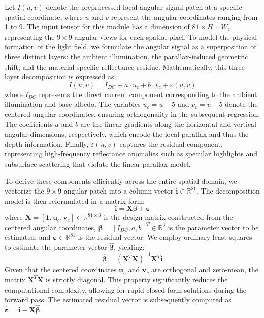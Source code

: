 \documentclass[lettersize,journal]{IEEEtran}
\begin{document}
Let $I(u,v)$ denote the preprocessed local angular signal patch at a specific spatial coordinate, where $u$ and $v$ represent the angular coordinates ranging from 1 to 9. The input tensor for this module has a dimension of $81 \times H \times W$, representing the $9 \times 9$ angular views for each spatial pixel. To model the physical formation of the light field, we formulate the angular signal as a superposition of three distinct layers: the ambient illumination, the parallax-induced geometric shift, and the material-specific reflectance residue. Mathematically, this three-layer decomposition is expressed as:
\begin{equation}
\label{eq:eq3}
I(u,v) = I_{DC} + a \cdot u_c + b \cdot v_c + \varepsilon(u,v)
\end{equation}
where $I_{DC}$ represents the direct current component corresponding to the ambient illumination and base albedo. The variables $u_c = u - 5$ and $v_c = v - 5$ denote the centered angular coordinates, ensuring orthogonality in the subsequent regression. The coefficients $a$ and $b$ are the linear gradients along the horizontal and vertical angular dimensions, respectively, which encode the local parallax and thus the depth information. Finally, $\varepsilon(u,v)$ captures the residual component, representing high-frequency reflectance anomalies such as specular highlights and subsurface scattering that violate the linear parallax model.

To derive these components efficiently across the entire spatial domain, we vectorize the $9 \times 9$ angular patch into a column vector $\mathbf{i} \in \mathbb{R}^{81}$. The decomposition model is then reformulated in a matrix form:
\begin{equation}
\label{eq:eq4}
\mathbf{i} = \mathbf{X} \boldsymbol{\beta} + \boldsymbol{\varepsilon}
\end{equation}
where $\mathbf{X} = [\mathbf{1}, \mathbf{u}_c, \mathbf{v}_c] \in \mathbb{R}^{81 \times 3}$ is the design matrix constructed from the centered angular coordinates, $\boldsymbol{\beta} = [I_{DC}, a, b]^T \in \mathbb{R}^{3}$ is the parameter vector to be estimated, and $\boldsymbol{\varepsilon} \in \mathbb{R}^{81}$ is the residual vector. We employ ordinary least squares to estimate the parameter vector $\hat{\boldsymbol{\beta}}$, yielding:
\begin{equation}
\label{eq:eq5}
\hat{\boldsymbol{\beta}} = (\mathbf{X}^T \mathbf{X})^{-1} \mathbf{X}^T \mathbf{i}
\end{equation}
Given that the centered coordinates $\mathbf{u}_c$ and $\mathbf{v}_c$ are orthogonal and zero-mean, the matrix $\mathbf{X}^T \mathbf{X}$ is strictly diagonal. This property significantly reduces the computational complexity, allowing for rapid closed-form solutions during the forward pass. The estimated residual vector is subsequently computed as $\hat{\boldsymbol{\varepsilon}} = \mathbf{i} - \mathbf{X} \hat{\boldsymbol{\beta}}$.
\end{document}
